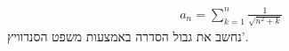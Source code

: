 \documentclass[a4paper, 12pt]{article}
\newcommand{\sub}[1]{\subsection{\underline{#1}}}
\newcommand{\eq}[1]{\begin{align*}#1\end{align*}}
\begin{document}
\begin{titlepage}
    
\end{titlepage}

\section{}
\setcounter{subsection}{1}
\sub{}
\eq{
    a_n=\sum^{n}_{k=1}\frac{1}{\sqrt{n^2+k}}
}
נחשב את גבול הסדרה באמצעות משפט הסנדוויץ'.

\end{document}
